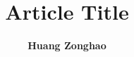 \documentclass[draft, 11pt, letterpaper]{article}
\begin{document}
\title{\textbf {Article Title}}
\author{\textbf{Huang Zonghao}}
\maketitle

% 

\end{document}
